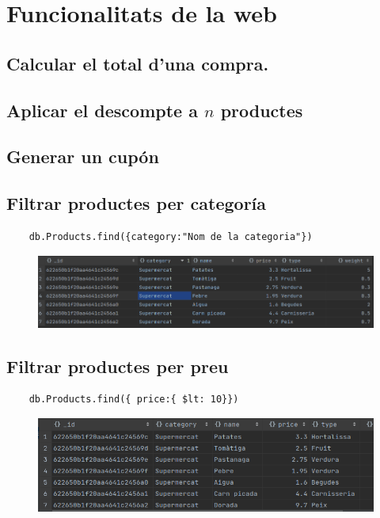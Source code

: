 \section{Funcionalitats de la web}

\subsection{Calcular el total d'una compra.}

\subsection{Aplicar el descompte a $n$ productes}

\subsection{Generar un cupón}

\subsection{Filtrar productes per categoría}

\begin{verbatim}
    db.Products.find({category:"Nom de la categoria"})
\end{verbatim}

\begin{figure}
    \centering
    \includegraphics[width=400pt]{figures/Filtratge categories.png}
\end{figure}

\subsection{Filtrar productes per preu}

\begin{verbatim}
    db.Products.find({ price:{ $lt: 10}})
\end{verbatim}

\begin{figure}
    \centering
    \includegraphics[width=400pt]{figures/preu.png}
\end{figure}

